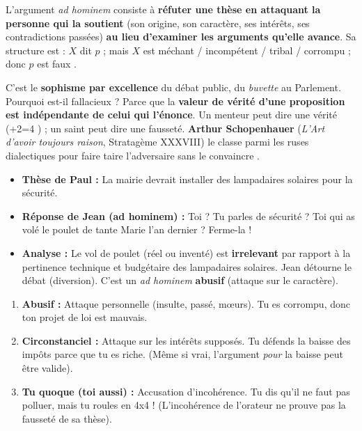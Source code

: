 \documentclass[11pt]{article}
\newcommand{\cle}[1]{{\popxbold\color{popdark}#1}}
\begin{document}
\begin{definition}
L'\cle{argument \emph{ad hominem}} consiste à \textbf{réfuter une thèse en attaquant la personne qui la soutient} (son origine, son caractère, ses intérêts, ses contradictions passées) \textbf{au lieu d'examiner les arguments qu'elle avance}. Sa structure est : \guillemotleft $X$ dit $p$ ; mais $X$ est méchant / incompétent / tribal / corrompu ; donc $p$ est faux \guillemotright.
\end{definition}

C'est le \textbf{sophisme par excellence} du débat public, du \emph{buvette} au Parlement. Pourquoi est-il fallacieux ? Parce que la \textbf{valeur de vérité d'une proposition est indépendante de celui qui l'énonce}. Un menteur peut dire une vérité (+2=4 \guillemotright) ; un saint peut dire une fausseté. \textbf{Arthur Schopenhauer} (\emph{L'Art d'avoir toujours raison}, Stratagème XXXVIII) le classe parmi les \guillemotleft ruses dialectiques \guillemotright pour \guillemotleft faire taire l'adversaire sans le convaincre \guillemotright.

\begin{exemplebox}
\begin{itemize}
    \item \textbf{Thèse de Paul :} \guillemotleft La mairie devrait installer des lampadaires solaires pour la sécurité. \guillemotright
    \item \textbf{Réponse de Jean (ad hominem) :} \guillemotleft Toi ? Tu parles de sécurité ? Toi qui as volé le poulet de tante Marie l'an dernier ? Ferme-la ! \guillemotright
    \item \textbf{Analyse :} Le vol de poulet (réel ou inventé) est \textbf{irrelevant} par rapport à la pertinence technique et budgétaire des lampadaires solaires. Jean détourne le débat (diversion). C'est un \emph{ad hominem} \textbf{abusif} (attaque sur le caractère).
\end{itemize}
\end{exemplebox}

\begin{aretenir}
\begin{enumerate}
    \item \textbf{Abusif :} Attaque personnelle (insulte, passé, mœurs). \guillemotleft Tu es corrompu, donc ton projet de loi est mauvais. \guillemotright
    \item \textbf{Circonstanciel :} Attaque sur les intérêts supposés. \guillemotleft Tu défends la baisse des impôts parce que tu es riche. \guillemotright (Même si vrai, l'argument \emph{pour} la baisse peut être valide).
    \item \textbf{Tu quoque (toi aussi) :} Accusation d'incohérence. \guillemotleft Tu dis qu'il ne faut pas polluer, mais tu roules en 4x4 ! \guillemotright (L'incohérence de l'orateur ne prouve pas la fausseté de sa thèse).
\end{enumerate}
\end{aretenir}
\end{document}
